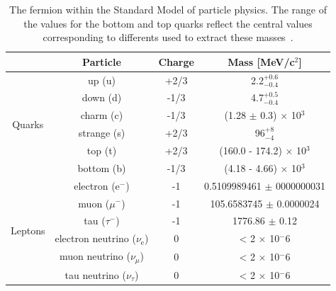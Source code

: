 \documentclass[main.tex]{subfiles}
\begin{document}
\begin{table}[h!]
\centering
\begin{tabular}{c|c|c|c}
\toprule
 & Particle & Charge & Mass [MeV/c$^\text{2}$] \\ [0.1cm]
\hline
\multirow{6}{*}{Quarks} & up (u)      & +2/3 & 2.2$^{+\text{0.6}}_{-\text{0.4}}$       \\ [0.1cm]
                        & down (d)    & -1/3 & 4.7$^{+\text{0.5}}_{-\text{0.4}}$       \\ [0.1cm]
                        & charm (c)   & -1/3 & (1.28 $\pm$ 0.3) $\times$ 10$^\text{3}$ \\ [0.1cm]
                        & strange (s) & +2/3 & 96$^{+\text{8}}_{-\text{4}}$            \\ [0.1cm]
                        & top (t)     & +2/3 & (160.0 - 174.2) $\times$ 10$^\text{3}$  \\ [0.1cm]
                        & bottom (b)  & -1/3 & (4.18 - 4.66) $\times$ 10$^\text{3}$    \\ [0.1cm]
\hline
\multirow{6}{*}{Leptons} & electron (e$^-$)                     & -1 & 0.5109989461 $\pm$ 0000000031 \\ [0.1cm]
                         & muon ($\mu^-$)                       & -1 & 105.6583745 $\pm$ 0.0000024   \\ [0.1cm]
                         & tau ($\tau^-$)                       & -1 & 1776.86 $\pm$ 0.12            \\ [0.1cm]
                         & electron neutrino ($\nu_{\text{e}}$) & 0  & < 2 $\times$ 10$^-\text{6}$   \\ [0.1cm]
                         & muon neutrino ($\nu_\mu$)            & 0  & < 2 $\times$ 10$^-\text{6}$   \\ [0.1cm]
                         & tau neutrino ($\nu_\tau$)            & 0  & < 2 $\times$ 10$^-\text{6}$   \\ [0.1cm]
\bottomrule
\end{tabular}
\caption{The fermion within the Standard Model of particle physics. The range of the values for the bottom and top quarks reflect the central values corresponding to differents used to extract these masses~\cite{PDG2016}.}
\label{tab:fermionSM}
\end{table}

\FloatBarrier
\end{document}
